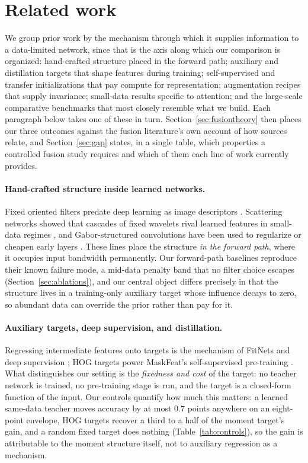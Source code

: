 \section{Related work}\label{sec:related}

 We group prior work by the mechanism through which it supplies
information to a data-limited network, since that is the axis along which
our comparison is organized: hand-crafted structure placed in the forward
path; auxiliary and distillation targets that shape features during
training; self-supervised and transfer initializations that pay compute
for representation; augmentation recipes that supply invariance;
small-data results specific to attention; and the large-scale comparative
benchmarks that most closely resemble what we build. Each paragraph below
takes one of these in turn. Section~\ref{sec:fusiontheory} then places our
three outcomes against the fusion literature's own account of how sources
relate, and Section~\ref{sec:gap} states, in a single table, which
properties a controlled fusion study requires and which of them each line
of work currently provides.

\paragraph{Hand-crafted structure inside learned networks.}
Fixed oriented filters predate deep learning as image descriptors
\citep{dalal2005hog}. Scattering networks showed that
cascades of fixed wavelets rival learned features in small-data regimes
\citep{bruna2013scattering}, and Gabor-structured
convolutions have been used to regularize or cheapen early layers
\citep{luan2018gaborcnn}. These lines place the structure
\emph{in the forward path}, where it occupies input bandwidth permanently.
Our forward-path baselines reproduce their known failure mode, a
mid-data penalty band that no filter choice escapes
(Section~\ref{sec:ablations}), and our central object differs precisely
in that the structure lives in a training-only auxiliary target whose
influence decays to zero, so abundant data can override the prior rather
than pay for it.

\paragraph{Auxiliary targets, deep supervision, and distillation.}
 Regressing intermediate features onto targets is the mechanism of FitNets
\citep{romero2015fitnets} and deep supervision \citep{lee2015deeply}; HOG
targets power MaskFeat's self-supervised pre-training
\citep{wei2022maskfeat}. What distinguishes our setting is the
\emph{fixedness and cost} of the target: no teacher network is trained, no
pre-training stage is run, and the target is a closed-form function of the
input. Our controls quantify how much this matters: a learned same-data
teacher moves accuracy by at most $0.7$ points anywhere on an eight-point
envelope, HOG targets recover a third to a half of the moment target's gain, and a
random fixed target does nothing (Table~\ref{tab:controls}), so the gain
is attributable to the moment structure itself, not to auxiliary
regression as a mechanism.

